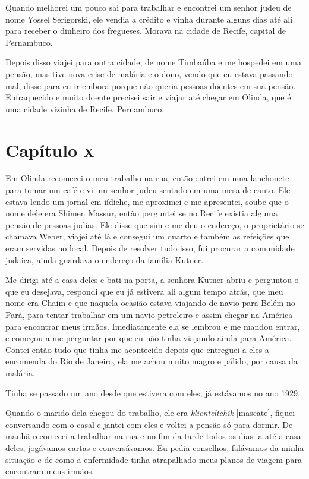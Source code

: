 Quando melhorei um pouco sai para trabalhar e encontrei um senhor judeu
de nome Yossel Serigorski, ele vendia a crédito e vinha durante alguns
dias até ali para receber o dinheiro dos fregueses. Morava na cidade de
Recife, capital de Pernambuco.

Depois disso viajei para outra cidade, de nome Timbaúba e me hospedei em
uma pensão, mas tive nova crise de malária e o dono, vendo que eu estava
passando mal, disse para eu ir embora porque não queria pessoas doentes
em sua pensão. Enfraquecido e muito doente precisei sair e viajar até
chegar em Olinda, que é uma cidade vizinha de Recife, Pernambuco.

\chapter{Capítulo \textsc{x}}

Em Olinda recomecei o meu trabalho na rua, então entrei em uma
lanchonete para tomar um café e vi um senhor judeu sentado em uma mesa
de canto. Ele estava lendo um jornal em iídiche, me aproximei e me
apresentei, soube que o nome dele era Shimen Massur, então perguntei se
no Recife existia alguma pensão de pessoas judias. Ele disse que sim e
me deu o endereço, o proprietário se chamava Weber, viajei até lá e
consegui um quarto e também as refeições que eram servidas no local.
Depois de resolver tudo isso, fui procurar a comunidade judaica, ainda
guardava o endereço da família Kutner.

Me dirigi até a casa deles e bati na porta, a senhora Kutner abriu e
perguntou o que eu desejava, respondi que eu já estivera ali algum tempo
atrás, que meu nome era Chaim e que naquela ocasião estava viajando de
navio para Belém no Pará, para tentar trabalhar em um navio petroleiro e
assim chegar na América para encontrar meus irmãos. Imediatamente ela se
lembrou e me mandou entrar, e começou a me perguntar por que eu não
tinha viajando ainda para América. Contei então tudo que tinha me
acontecido depois que entreguei a eles a encomenda do Rio de Janeiro,
ela me achou muito magro e pálido, por causa da malária.

Tinha se passado um ano desde que estivera com eles, já estávamos no ano
1929.

Quando o marido dela chegou do trabalho, ele era \textit{klienteltchik} [mascate], 
fiquei conversando com o casal e jantei com eles e
voltei a pensão só para dormir. De manhã recomecei a trabalhar na rua e
no fim da tarde todos os dias ia até a casa deles, jogávamos cartas e
conversávamos. Eu pedia conselhos, falávamos da minha situação e de como
a enfermidade tinha atrapalhado meus planos de viagem para encontram
meus irmãos.

